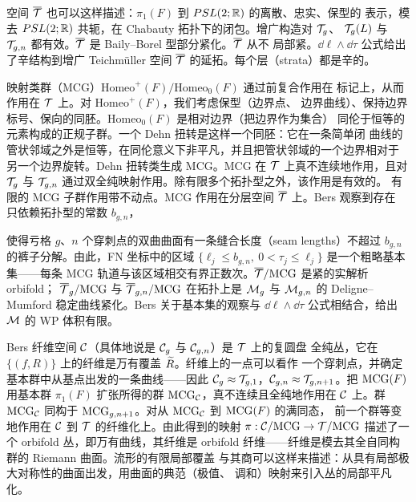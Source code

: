 空间 $\overline{\mathcal{T}}$ 也可以这样描述：$\pi_1(F)$ 到 $PSL(2;\mathbb{R})$ 的离散、忠实、保型的
表示，模去 $PSL(2;\mathbb{R})$ 共轭，在 Chabauty 拓扑下的闭包。增广构造对 $\mathcal{T}_g$、
$\mathcal{T}_g(L)$ 与 $\mathcal{T}_{g,n}$ 都有效。$\overline{\mathcal{T}}$ 是 Baily--Borel 型部分紧化。$\overline{\mathcal{T}}$ 从不
局部紧。$\dd\ell\wedge\dd\tau$ 公式给出了辛结构到增广 Teichm\"uller 空间
$\overline{\mathcal{T}}$ 的延拓。每个层（strata）都是辛的。

映射类群（MCG）$\mathrm{Homeo}^+(F)/\mathrm{Homeo}_0(F)$ 通过前复合作用在
标记上，从而作用在 $\mathcal{T}$ 上。对 $\mathrm{Homeo}^+(F)$，我们考虑保型（边界点、
边界曲线）、保持边界标号、保向的同胚。$\mathrm{Homeo}_0(F)$ 是相对边界（把边界作为集合）
同伦于恒等的元素构成的正规子群。一个 Dehn 扭转是这样一个同胚：它在一条简单闭
曲线的管状邻域之外是恒等，在同伦意义下非平凡，并且把管状邻域的一个边界相对于
另一个边界旋转。Dehn 扭转类生成 MCG。MCG 在 $\mathcal{T}$ 上真不连续地作用，且对
$\mathcal{T}_g$ 与 $\mathcal{T}_{g,n}$ 通过双全纯映射作用。除有限多个拓扑型之外，该作用是有效的。
有限的 MCG 子群作用带不动点。MCG 作用在分层空间 $\overline{\mathcal{T}}$ 上。Bers 观察到存在
只依赖拓扑型的常数 $b_{g,n}$，

使得亏格 $g$、$n$ 个穿刺点的双曲曲面有一条缝合长度（seam lengths）不超过
$b_{g,n}$ 的裤子分解。由此，FN 坐标中的区域
$\{\ell_j\le b_{g,n},\ 0<\tau_j\le\ell_j\}$ 是一个粗略基本集——每条 MCG
轨道与该区域相交有界正数次。$\overline{\mathcal{T}}/\mathrm{MCG}$ 是紧的实解析 orbifold；
$\overline{\mathcal{T}}_g/\mathrm{MCG}$ 与 $\overline{\mathcal{T}}_{g,n}/\mathrm{MCG}$ 在拓扑上是 $\mathcal{M}_g$ 与 $\mathcal{M}_{g,n}$ 的
Deligne--Mumford 稳定曲线紧化。Bers 关于基本集的观察与 $\dd\ell\wedge\dd\tau$
公式相结合，给出 $\mathcal{M}$ 的 WP 体积有限。

Bers 纤维空间 $\mathcal{C}$（具体地说是 $\mathcal{C}_g$ 与 $\mathcal{C}_{g,n}$）是 $\mathcal{T}$ 上的复圆盘
全纯丛，它在 $\{(f,R)\}$ 上的纤维是万有覆盖 $\widetilde{R}$。纤维上的一点可以看作
一个穿刺点，并确定基本群中从基点出发的一条曲线——因此
$\mathcal{C}_g\approx\mathcal{T}_{g,1}$，$\mathcal{C}_{g,n}\approx\mathcal{T}_{g,n+1}$。把 $\mathrm{MCG}(F)$ 用基本群
$\pi_1(F)$ 扩张所得的群 $\mathrm{MCG}_{\mathcal{C}}$，真不连续且全纯地作用在 $\mathcal{C}$ 上。群
$\mathrm{MCG}_{\mathcal{C}}$ 同构于 $\mathrm{MCG}_{g,n+1}$。对从 $\mathrm{MCG}_{\mathcal{C}}$ 到 $\mathrm{MCG}(F)$ 的满同态，
前一个群等变地作用在 $\mathcal{C}$ 到 $\mathcal{T}$ 的纤维化上。由此得到的映射
$\pi:\mathcal{C}/\mathrm{MCG}\to\mathcal{T}/\mathrm{MCG}$ 描述了一个 orbifold 丛，即万有曲线，其纤维是
orbifold 纤维——纤维是模去其全自同构群的 Riemann 曲面。流形的有限局部覆盖
与其商可以这样来描述：从具有局部极大对称性的曲面出发，用曲面的典范（极值、
调和）映射来引入丛的局部平凡化。


